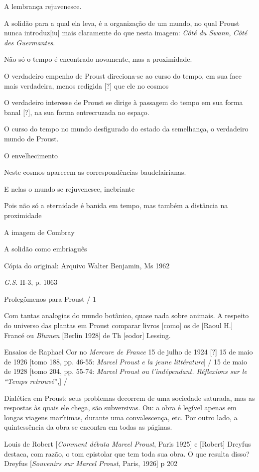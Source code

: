 A lembrança rejuvenesce.

A solidão para a qual ela leva, é a organização de um mundo, no qual
Proust nunca introduz{[}iu{]} mais claramente do que nesta imagem:
\emph{Côté du Swann}, \emph{Côté des Guermantes}.

Não só o tempo é encontrado novamente, mas a proximidade.

O verdadeiro empenho de Proust direciona-se ao curso do tempo, em sua
face mais verdadeira, menos redigida {[}?{]} que ele no cosmos

O verdadeiro interesse de Proust se dirige à passagem do tempo em sua
forma banal {[}?{]}, na sua forma entrecruzada no espaço.

O curso do tempo no mundo desfigurado do estado da semelhança, o
verdadeiro mundo de Proust.

O envelhecimento

Neste cosmos aparecem as correspondências baudelairianas.

E nelas o mundo se rejuvenesce, inebriante

Pois não só a eternidade é banida em tempo, mas também a distância na
proximidade

A imagem de Combray

A solidão como embriaguês

Cópia do original: Arquivo Walter Benjamin, Ms 1962

\emph{G.S.} II-3, p. 1063

Prolegômenos para Proust / 1

Com tantas analogias do mundo botânico, quase nada sobre animais. A
respeito do universo das plantas em Proust comparar livros {[}como{]} os
de {[}Raoul H.{]} Francé ou \emph{Blumen} {[}Berlin 1928{]} de Th
{[}eodor{]} Lessing.

Ensaios de Raphael Cor no \emph{Mercure de France} 15 de julho de 1924
{[}?{]} 15 de maio de 1926 {[}tomo 188, pp. 46-55: \emph{Marcel Proust e
la jeune littérature}{]} / 15 de maio de 1928 {[}tomo 204, pp. 55-74:
\emph{Marcel Proust ou l'indépendant. Réflexions sur le ``Temps
retrouvé}'',{]} /

Dialética em Proust: seus problemas decorrem de uma sociedade saturada,
mas as respostas às quais ele chega, são subversivas. Ou: a obra é
legível apenas em longas viagens marítimas, durante uma convalescença,
etc. Por outro lado, a quintessência da obra se encontra em todas as
páginas.

Louis de Robert {[}\emph{Comment débuta Marcel Proust}, Paris 1925{]} e
{[}Robert{]} Dreyfus destaca, com razão, o tom epistolar que tem toda
sua obra. O que resulta disso? Dreyfus {[}\emph{Souvenirs sur Marcel
Proust}, Paris, 1926{]} p 202


